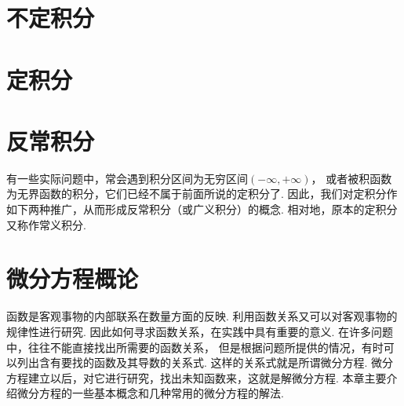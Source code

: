 \chapter{不定积分}\label{chapter:不定积分}






\chapter{定积分}








\chapter{反常积分}
有一些实际问题中，常会遇到积分区间为无穷区间\((-\infty,+\infty)\)，
或者被积函数为无界函数的积分，它们已经不属于前面所说的定积分了.
因此，我们对定积分作如下两种推广，从而形成反常积分（或广义积分）的概念.
相对地，原本的定积分又称作常义积分.









\chapter{微分方程概论}
函数是客观事物的内部联系在数量方面的反映.
利用函数关系又可以对客观事物的规律性进行研究.
因此如何寻求函数关系，在实践中具有重要的意义.
在许多问题中，往往不能直接找出所需要的函数关系，
但是根据问题所提供的情况，有时可以列出含有要找的函数及其导数的关系式.
这样的关系式就是所谓微分方程.
微分方程建立以后，对它进行研究，找出未知函数来，这就是解微分方程.
本章主要介绍微分方程的一些基本概念和几种常用的微分方程的解法.











